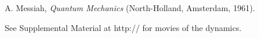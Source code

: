 \documentclass[aps,onecolumn,superscriptaddress,showpacs,pra]{revtex4}
\begin{document}









    \begin{thebibliography}{99}
        A. Messiah, {\it Quantum Mechanics} (North-Holland, Amsterdam, 1961).

        See Supplemental Material at http:// for movies of the dynamics.

    \end{thebibliography}
\end{document}
